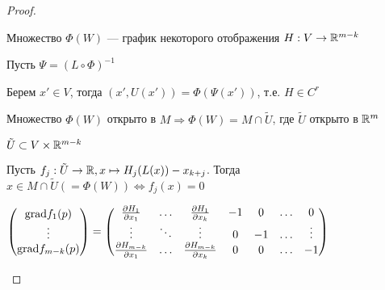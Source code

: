 \begin{proof}
\begin{itemize}

              Множество $\Phi(W)$ --- график некоторого отображения $H : V\to\mathbb{R}^{m-k}$

              Пусть $\Psi = (L \circ \Phi)^{-1}$

              Берем $x' \in V$, тогда $(x', U(x')) = \Phi(\Psi(x'))$, т.е. $H\in C^r$

              Множество $\Phi(W)$ открыто в $M \Rightarrow \Phi(W) = M \cap \tilde U$, где $\tilde U$ открыто в $\mathbb{R}^m$

              $\tilde U\subset V\times \mathbb{R}^{m-k}$

              Пусть $f_j : \tilde U \to\mathbb{R}, x\mapsto H_j(L(x)) - x_{k+j}$. Тогда $x\in M\cap \tilde U (=\Phi(W)) \Leftrightarrow f_j(x)=0$

              $\begin{pmatrix}
                      \text{grad} f_1(p) \\
                      \vdots       \\
                      \text{grad} f_{m-k}(p)
                  \end{pmatrix} = \begin{pmatrix}
                      \frac{\partial H_1}{\partial x_1}     & \ldots & \frac{\partial H_1}{\partial x_k}     & -1 & 0  & \ldots & 0      \\
                      \vdots                                & \ddots & \vdots                                & 0  & -1 & \ldots & \vdots \\
                      \frac{\partial H_{m-k}}{\partial x_1} & \ldots & \frac{\partial H_{m-k}}{\partial x_k} & 0  & 0  & \ldots & -1     \\
                  \end{pmatrix}$


\end{itemize}
\end{proof}
